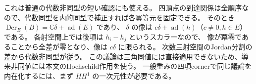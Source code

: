 これは普通の代数非同型の短い確認にも使える。
四頂点の到達関係は全順序なので、代数同型を内的同型で補正すれば各冪等元を固定できる。
そのとき $\operatorname{Der}_E(B)=\mathbb C\delta+\operatorname{ad}(E)$ であり、
$\delta$ の像は $c\delta+\operatorname{ad}(h)$（$c\ne0,h\in E$）である。
各射空間上では後項は $h_i-h_j$ というスカラーなので、
像が冪零であることから全差が零となり、像は $c\delta$ に限られる。
次数三射空間のJordan分割の差から代数非同型が従う。
この議論は三角同値には直接適用できないため、導来非同値には本文のHochschild作用を使う。
一般重みの四項cornerで同じ議論を内在化するには、まず $HH^1$ の一次元性が必要である。
